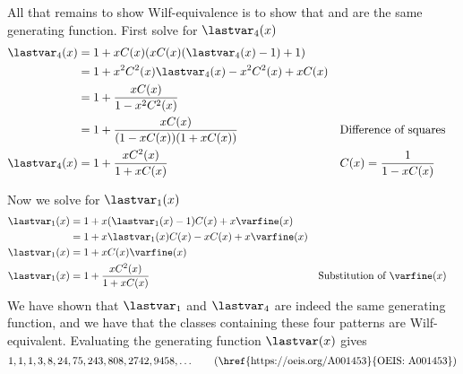 All that remains to show Wilf-equivalence is to show that  and
 are the same generating function.
First solve  for \(\lastvar_4(x)\)
\begin{equation}
    \begin{aligned}
        \lastvar_4(x) &= 1+xC(x)(xC(x)(\lastvar_4(x)-1)+1)\\
        &= 1 + x^2C^2(x)\lastvar_4(x) -x^2C^2(x) +xC(x)\\
        &= 1 + \frac{xC(x)}{1 - x^2C^2(x)}\\
        &= 1 + \frac{xC(x)}{(1-xC(x))(1+xC(x))} && \text{Difference of squares}\\
        \lastvar_4(x)&= 1 + \frac{xC^2(x)}{1+xC(x)} && C(x) = \frac{1}{1-xC(x)}
    \end{aligned}
\end{equation}

Now we solve  for \(\lastvar_1(x)\)
\begin{equation}
    \begin{aligned}
        \lastvar_1(x)&= 1+x(\lastvar_1(x)-1)C(x)+x\varfine(x)\\
        &= 1+x\lastvar_1(x)C(x)-xC(x)+x\varfine(x)\\
        \lastvar_1(x)&= 1+xC(x)\varfine(x)\\
        \lastvar_1(x) &= 1 + \frac{xC^2(x)}{1+xC(x)} &&\text{Substitution of \(\varfine(x)\)}
    \end{aligned}
\end{equation}
We have shown that \(\lastvar_1\) and \(\lastvar_4\) are indeed the same generating function,
and we have that the classes containing these four patterns are Wilf-equivalent.
Evaluating the generating function \(\lastvar(x)\) gives
\begin{equation*}
    1, 1, 1, 3, 8, 24, 75, 243, 808, 2742, 9458,\dotsc \tag{\href{https://oeis.org/A001453}{OEIS: A001453}}
\end{equation*}

